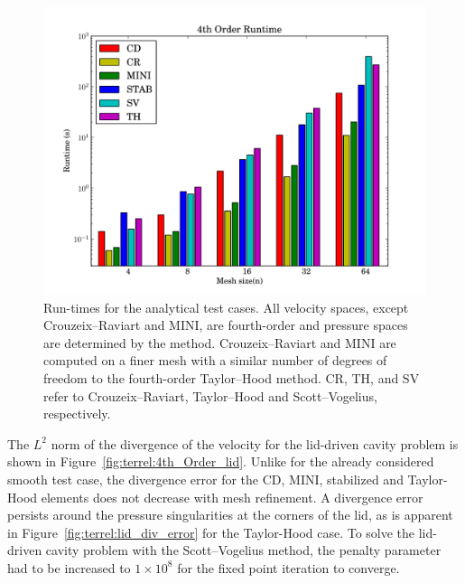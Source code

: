 \begin{figure}
  \center \includegraphics[width=\largefig]{chapters/terrel/pdf/run_4.pdf}
  \caption{Run-times for the analytical test cases.  All velocity spaces,
    except Crouzeix--Raviart and MINI, are fourth-order and pressure
    spaces are determined by the method. Crouzeix--Raviart and MINI are
    computed on a finer mesh with a similar number of degrees of freedom
    to the fourth-order Taylor--Hood method. CR, TH, and SV refer to
    Crouzeix--Raviart, Taylor--Hood and Scott--Vogelius, respectively.}
  \label{fig:terrel:4th_Order:run}
\end{figure}

The $L^{2}$ norm of the divergence of the velocity for the lid-driven
cavity problem is shown in Figure~\ref{fig:terrel:4th_Order_lid}.
Unlike for the already considered smooth test case, the divergence
error for the CD, MINI, stabilized and Taylor-Hood elements does not
decrease with mesh refinement.  A divergence error persists around
the pressure singularities at the corners of the lid, as is apparent
in Figure~\ref{fig:terrel:lid_div_error} for the Taylor-Hood case.
To solve the lid-driven cavity problem with the Scott--Vogelius method,
the penalty parameter had to be increased to $1 \times 10^{8}$ for the
fixed point iteration to converge.

